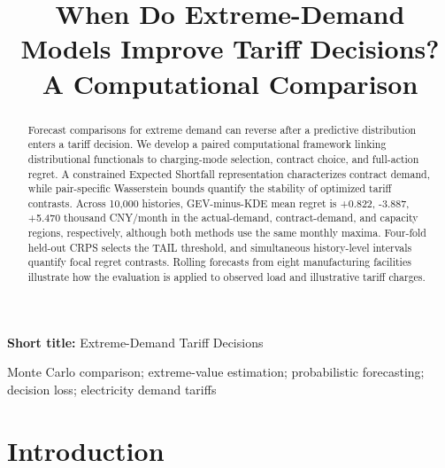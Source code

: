 \documentclass[suppldata]{interact}
\begin{document}
\title{When Do Extreme-Demand Models Improve Tariff Decisions? A Computational Comparison}
\author{
}
\maketitle
\noindent\textbf{Short title:} Extreme-Demand Tariff Decisions
\begin{abstract}
Forecast comparisons for extreme demand can reverse after a predictive distribution enters a tariff decision. We develop a paired computational framework linking distributional functionals to charging-mode selection, contract choice, and full-action regret. A constrained Expected Shortfall representation characterizes contract demand, while pair-specific Wasserstein bounds quantify the stability of optimized tariff contrasts. Across 10,000 histories, GEV-minus-KDE mean regret is +0.822, -3.887, +5.470 thousand CNY/month in the actual-demand, contract-demand, and capacity regions, respectively, although both methods use the same monthly maxima. Four-fold held-out CRPS selects the TAIL threshold, and simultaneous history-level intervals quantify focal regret contrasts. Rolling forecasts from eight manufacturing facilities illustrate how the evaluation is applied to observed load and illustrative tariff charges.
\end{abstract}
\begin{keywords}
Monte Carlo comparison; extreme-value estimation; probabilistic forecasting; decision loss; electricity demand tariffs
\end{keywords}
\linenumbers
\section{Introduction}
\label{sec:introduction}
\end{document}
